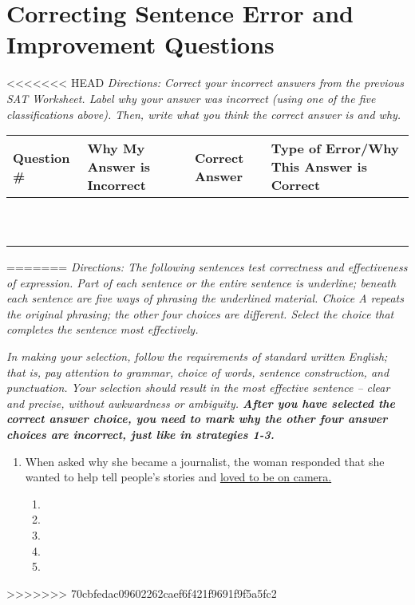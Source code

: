 \section{Correcting Sentence Error and Improvement Questions}

<<<<<<< HEAD
\textit{Directions: Correct your incorrect answers from the previous SAT Worksheet. Label why your answer
was incorrect (using one of the five classifications above). Then, write what you think the correct
answer is and why.}

\begin{tabularx}{\textwidth}{|X|p{2in}|p{2in}|X|}\hline
Question \# & Why My Answer is Incorrect & Correct Answer & Type of Error/Why This Answer is Correct\\\hline
& & &\\[5ex]\hline
& & &\\[5ex]\hline
& & &\\[5ex]\hline
& & &\\[5ex]\hline
& & &\\[5ex]\hline
& & &\\[5ex]\hline
& & &\\[5ex]\hline
& & &\\[5ex]\hline
& & &\\[5ex]\hline
& & &\\[5ex]\hline
\end{tabularx}
=======
\textit{Directions: The following sentences test correctness and effectiveness of expression. Part of each sentence or the entire sentence is underline; beneath each sentence are five ways of phrasing the underlined material. Choice A repeats the original phrasing; the other four choices are different. Select the choice that completes the sentence most effectively.}

\bigskip
\textit{In making your selection, follow the requirements of standard written English; that is, pay attention to grammar, choice of words, sentence construction, and punctuation. Your selection should result in the most effective sentence -- clear and precise, without awkwardness or ambiguity. \textbf{After you have selected the correct answer choice, you need to mark why the other four answer choices are incorrect, just like in strategies 1-3.}}

\begin{enumerate}
\item When asked why she became a journalist, the woman responded that she wanted to help tell people’s stories and \ul{ loved to be on camera.}

\bigskip
\begin{enumerate}[label=(\Alph*)]
\item    \hrulefill
\item    \hrulefill
\item   \hrulefill
\item   \hrulefill
\item   \hrulefill
\end{enumerate}

\end{enumerate}
>>>>>>> 70cbfedac09602262caef6f421f9691f9f5a5fc2

